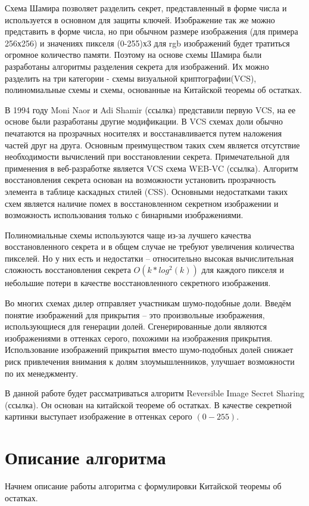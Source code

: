 \documentclass[a4paper,article,14pt]{extarticle}
\begin{document}
Схема Шамира позволяет разделить секрет, представленный в форме числа и используется в основном для защиты ключей. Изображение так же 
можно представить в форме числа, но при обычном размере изображения (для примера 256х256) и значениях пикселя (0-255)х3 для rgb изображений
будет тратиться огромное количество памяти. Поэтому на основе схемы Шамира были разработаны алгоритмы разделения секрета для изображений. 
Их можно разделить на три категории - схемы визуальной криптографии(VCS), полиномиальные схемы и схемы, основанные на Китайской теоремы об остатках. 

В 1994 году Moni Naor и Adi Shamir (ссылка) представили первую VCS, на ее основе были разработаны другие модификации.
В VCS схемах доли обычно печатаются на прозрачных носителях и восстанавливается путем наложения частей друг на друга. 
Основным преимуществом таких схем является отсутствие необходимости вычислений при восстановлении секрета.
Примечательной для применения в веб-разработке является VCS схема WEB-VC (ссылка). Алгоритм восстановления секрета основан 
на возможности установить прозрачность элемента в таблице каскадных стилей (CSS). Основными недостатками таких схем является 
наличие помех в восстановленном секретном изображении и возможность использования только с бинарными изображениями.

Полиномиальные схемы используются чаще из-за лучшего качества восстановленного секрета и в общем случае 
не требуют увеличения количества пикселей. Но у них есть и недостатки -- относительно высокая вычислительная сложность 
восстановления секрета $O(k*log^2(k))$ для каждого пикселя и небольшие потери в качестве восстановленного секретного изображения.


Во многих схемах дилер отправляет участникам шумо-подобные доли. Введём понятие изображений для прикрытия -- это произвольные 
изображения, использующиеся для генерации долей. Сгенерированные доли 
являются изображениями в оттенках серого, похожими на изображения прикрытия. Использование изображений прикрытия 
вместо шумо-подобных долей снижает риск привлечения внимания к долям злоумышленников, улучшает возможности 
по их менеджменту. 

В данной работе будет рассматриваться алгоритм Reversible Image Secret Sharing (ссылка). Он основан на китайской 
теореме об остатках. В качестве секретной картинки выступает изображение в оттенках серого $(0-255)$.


\newpage
\section{Описание алгоритма}
Начнем описание работы алгоритма с формулировки Китайской теоремы об остатках.
\end{document}
